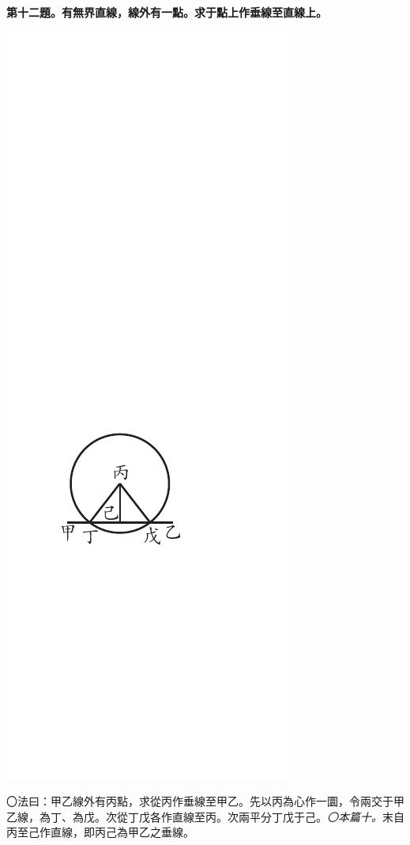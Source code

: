 \documentclass[12pt,b5paper,landscape]{article}
\newcommand{\ccom}[1]{{\footnotesize \emph{〇#1}}}
\newcommand{\bcom}[1]{〇#1}
\newcommand{\cthm}[1]{{
\vspace{8pt}

\bfseries #1}}
\begin{document}
\begin{multicols}{2}
\cthm{第十二題。有無界直線，線外有一點。求于點上作垂線至直線上。}
\begin{center}
\includegraphics[angle=90]{eu55}
\end{center}
\bcom{法曰：甲乙線外有丙點，求從丙作垂線至甲乙。先以丙為心作一圜，令兩交于甲乙線，為丁、為戊。次從丁戊各作直線至丙。次兩平分丁戊于己。\ccom{本篇十。}末自丙至己作直線，即丙己為甲乙之垂線。}

\end{multicols}
\end{document}
